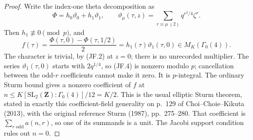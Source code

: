 \documentclass[11pt,a4paper]{article}
\theoremstyle{definition}
\begin{document}
\begin{proof}
Write the index-one theta decomposition as
\[
 \Phi=h_0\vartheta_0+h_1\vartheta_1,\qquad
 \vartheta_\mu(\tau,z)=
       \sum_{r\equiv\mu\ (2)}q^{r^2/4}\zeta^r.
\]
Then $h_1\not\equiv0\pmod p$, and
\[
 f(\tau)=\frac{\Phi(\tau,0)-\Phi(\tau,1/2)}2
        =h_1(\tau)\vartheta_1(\tau,0)
        \in M_K(\Gamma_0(4)).                           \tag{JF.4}
\]
The character is trivial, by (JF.2) at $z=0$; there is no unrecorded
multiplier.  The series $\vartheta_1(\tau,0)$ starts with $2q^{1/4}$,
so (JF.4) is nonzero modulo $p$; cancellation between the odd-$r$
coefficients cannot make it zero.  It is $p$-integral.
The ordinary Sturm bound gives a nonzero coefficient of $f$ at
$n\leq K[\mathrm{SL}_2(\mathbf Z):\Gamma_0(4)]/12=K/2$.
This is the usual elliptic Sturm theorem, stated in exactly this
coefficient-field generality on p.~129 of Choi--Choie--Kikuta (2013),
with the original reference Sturm (1987), pp.~275--280.
That coefficient is $\sum_{r\text{ odd}}a(n,r)$, so one of its
summands is a unit.  The Jacobi support condition rules out $n=0$.
\end{proof}
\end{document}
